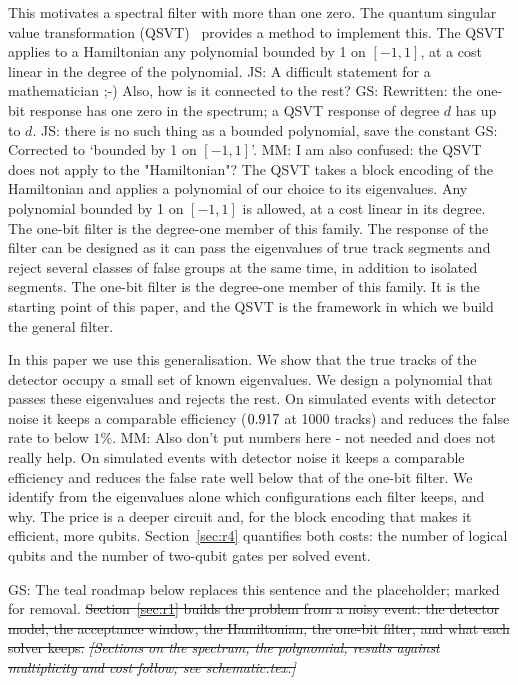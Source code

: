 \documentclass[11pt,a4paper]{article}
\newcommand{\js}[1]{{\color{blue} JS: #1 }}
\newcommand{\mm}[1]{{\color{purple} MM: #1 }}
\newcommand{\gs}[1]{{\color{orange!85!black} GS: #1 }}
\newcommand{\gss}[1]{{\color{teal} #1}}
\newcommand{\gsx}[1]{{\color{gray}\sout{#1}}}
\begin{document}
This motivates a spectral filter with more than one zero. The quantum singular value transformation
(QSVT)~\cite{gslw2019,martyn2021} provides a method to implement this. The QSVT applies to a Hamiltonian any polynomial
bounded by 1 on $[-1,1]$, at a cost linear in the degree of the polynomial. \js{A difficult statement for a mathematician ;-) Also, how is it connected to the rest?} \gs{Rewritten: the one-bit response has one zero in the spectrum; a QSVT response of degree $d$ has up to $d$.  } \js{there is no such thing as a bounded polynomial, save the constant} \gs{Corrected to `bounded by 1 on $[-1,1]$'.} 
\mm{I am also confused: the QSVT does not apply to the "Hamiltonian"?} \gss{The QSVT takes a block encoding of the Hamiltonian and applies a polynomial of our choice to its eigenvalues. Any polynomial bounded by 1 on $[-1,1]$ is allowed, at a cost linear in its degree. The one-bit filter is the degree-one member of this family.} The response of the
filter can be designed as it can pass the eigenvalues of true track segments and reject several classes of
false groups at the same time, in addition to  isolated segments. The one-bit filter is the degree-one member of this
family. It is the starting point of this paper, and the QSVT is the framework in which we build the
general filter.

In this paper we use this generalisation. We show that the true tracks of the detector occupy a small set
of known eigenvalues. We design a polynomial that passes these eigenvalues and rejects the rest. On
simulated events with detector noise it keeps a comparable efficiency ($0.917$ at 1000
tracks) and reduces the false rate to below $1\%$. \mm{Also don't put numbers here - not needed and does not really help.} \gss{On simulated events with detector noise it keeps a comparable efficiency and reduces the false rate well below that of the one-bit filter.} We identify from the eigenvalues alone which
configurations each filter keeps, and why. The price is a deeper circuit and, for the block encoding
that makes it efficient, more qubits. Section~\ref{sec:r4} quantifies both costs: the number of logical qubits and the number of two-qubit gates per solved event.


\gs{The teal roadmap below replaces this sentence and the placeholder; marked for removal.} \gsx{Section~\mbox{\ref{sec:r1}} builds the problem from a noisy event: the detector model, the acceptance
window, the Hamiltonian, the one-bit filter, and what each solver keeps.}
\gsx{\textit{[Sections on the spectrum, the polynomial, results against multiplicity and cost follow;
see schematic.tex.]}}
\end{document}
